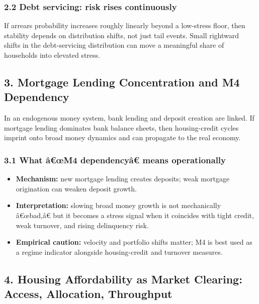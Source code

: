 \subsubsection{2.2 Debt servicing: risk rises
continuously}\label{debt-servicing-risk-rises-continuously}

If arrears probability increases roughly linearly beyond a low-stress
floor, then stability depends on distribution shifts, not just tail
events. Small rightward shifts in the debt-servicing distribution can
move a meaningful share of households into elevated stress.

\subsection{3. Mortgage Lending Concentration and M4
Dependency}\label{mortgage-lending-concentration-and-m4-dependency}

In an endogenous money system, bank lending and deposit creation are
linked. If mortgage lending dominates bank balance sheets, then
housing-credit cycles imprint onto broad money dynamics and can
propagate to the real economy.

\subsubsection{3.1 What â€œM4 dependencyâ€ means
operationally}\label{what-uxe2ux153m4-dependencyuxe2-means-operationally}

\begin{itemize}
\tightlist
\item
  \textbf{Mechanism:} new mortgage lending creates deposits; weak
  mortgage origination can weaken deposit growth.
\item
  \textbf{Interpretation:} slowing broad money growth is not
  mechanically â€œbad,â€ but it becomes a stress signal when it
  coincides with tight credit, weak turnover, and rising delinquency
  risk.
\item
  \textbf{Empirical caution:} velocity and portfolio shifts matter; M4
  is best used as a regime indicator alongside housing-credit and
  turnover measures.
\end{itemize}

\subsection{4. Housing Affordability as Market Clearing: Access,
Allocation,
Throughput}\label{housing-affordability-as-market-clearing-access-allocation-throughput}

